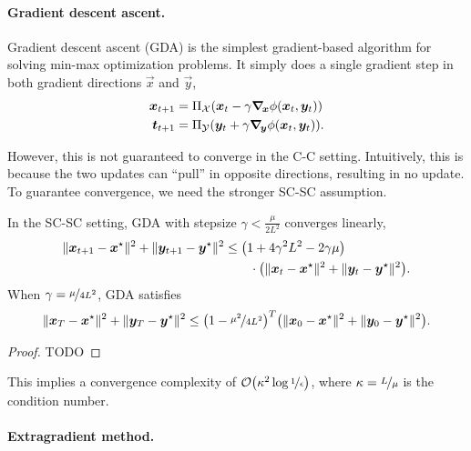\paragraph{Gradient descent ascent.}

Gradient descent ascent (GDA) is the simplest gradient-based algorithm for solving min-max
optimization problems. It simply does a single gradient step in both gradient directions \wrt
$\vec{x}$ and $\vec{y}$,
\begin{align*}
    \vec{x}_{t+1} & = \Pi_{\mathcal{X}}(\vec{x}_t - \gamma \grad{\phi(\vec{x}_t, \vec{y}_t)}{\vec{x}})  \\
    \vec{t}_{t+1} & = \Pi_{\mathcal{Y}}(\vec{y}_t + \gamma \grad{\phi(\vec{x}_t, \vec{y}_t)}{\vec{y}}).
\end{align*}

However, this is not guaranteed to converge in the C-C setting. Intuitively, this is because the
two updates can ``pull'' in opposite directions, resulting in no update. To guarantee convergence,
we need the stronger SC-SC assumption.

\begin{theorem}
    In the SC-SC setting, GDA with stepsize $\gamma < \frac{\mu}{2L^2}$ converges linearly,
    \begin{align*}
        \| \vec{x}_{t+1} - \vec{x}^\star \|^2 + \| \vec{y}_{t+1} - \vec{y}^\star \|^2 & \leq \lft( 1 + 4 \gamma^2 L^2 - 2 \gamma \mu \rgt)                                              \\
                                                                                      & \qquad \cdot \lft( \| \vec{x}_t - \vec{x}^\star \|^2 + \| \vec{y}_t - \vec{y}^\star \|^2 \rgt).
    \end{align*}
    When $\gamma = \nicefrac{\mu}{4 L^2}$, GDA satisfies \[
        \| \vec{x}_T - \vec{x}^\star \|^2 + \| \vec{y}_T - \vec{y}^\star \|^2 \leq \lft( 1 - \nicefrac{\mu^2}{4L^2} \rgt)^T \lft( \| \vec{x}_0 - \vec{x}^\star \|^2 + \| \vec{y}_0 - \vec{y}^\star \|^2 \rgt).
    \]
\end{theorem}

\begin{proof}
    TODO
\end{proof}

This implies a convergence complexity of $\bigo{\kappa^2 \log \nicefrac{1}{\epsilon}}$, where
$\kappa = \nicefrac{L}{\mu}$ is the condition number.

\paragraph{Extragradient method.}

